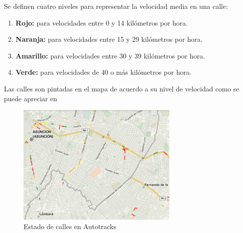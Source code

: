 Se definen cuatro niveles para representar la velocidad media en una calle:
\begin{enumerate}
\item \textbf{Rojo:}  para velocidades entre 0 y 14 kilómetros por hora.
\item \textbf{Naranja:}  para velocidades entre 15 y 29 kilómetros por hora.
\item \textbf{Amarillo:}  para velocidades entre 30 y 39 kilómetros por hora.
\item \textbf{Verde:}  para velocidades de 40 o más kilómetros por hora.
\end{enumerate}
Las calles son pintadas en el mapa de acuerdo a su nivel de velocidad como se puede apreciar en 
\begin{figure}[h]
	\centering
	\includegraphics[width=0.7\textwidth]{capitulos/6/figuras/figura3.jpg}
	\caption{\label{fig:calles} Estado de calles en Autotracks}	
\end{figure}
